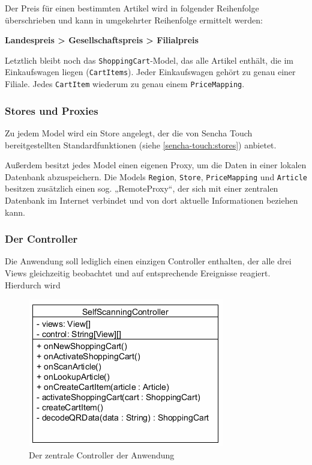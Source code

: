 Der Preis für einen bestimmten Artikel wird in folgender Reihenfolge überschrieben und kann in umgekehrter Reihenfolge ermittelt werden:
\begin{center}
	\textbf{Landespreis > Gesellschaftspreis > Filialpreis}
\end{center}

Letztlich bleibt noch das \texttt{ShoppingCart}-Model, das alle Artikel enthält, die im Einkaufswagen liegen (\texttt{CartItems}). Jeder Einkaufswagen gehört zu genau einer Filiale. Jedes \texttt{CartItem} wiederum zu genau einem \texttt{PriceMapping}.

\subsubsection*{Stores und Proxies}
Zu jedem Model wird ein Store angelegt, der die von Sencha Touch bereitgestellten Standardfunktionen (siehe \vref{sencha-touch:stores}) anbietet.

Außerdem besitzt jedes Model einen eigenen Proxy, um die Daten in einer lokalen Datenbank abzuspeichern. Die Models \texttt{Region}, \texttt{Store}, \texttt{PriceMapping} und \texttt{Article} besitzen zusätzlich einen sog. „RemoteProxy“, der sich mit einer zentralen Datenbank im Internet verbindet und von dort aktuelle Informationen beziehen kann.

\subsubsection*{Der Controller}
Die Anwendung soll lediglich einen einzigen Controller enthalten, der alle drei Views gleichzeitig beobachtet und auf entsprechende Ereignisse reagiert. Hierdurch wird %

\begin{figure}[H]
\includegraphics[scale=1]{res/controller.png}
\caption{Der zentrale Controller der Anwendung}
\end{figure}

